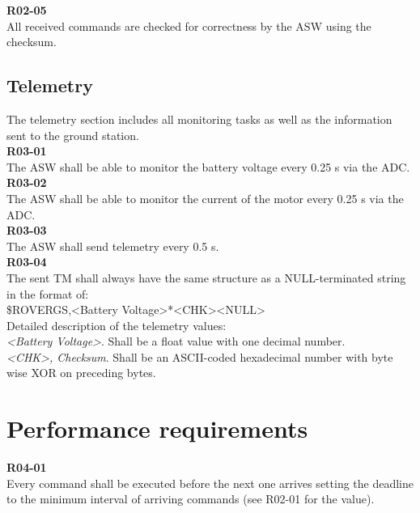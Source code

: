 \textbf{R02-05}\\
All received commands are checked for correctness by the ASW using the checksum.\\

\subsection{Telemetry}

The telemetry section includes all monitoring tasks as well as the information sent to the ground station.\\

\textbf{R03-01}\\
The ASW shall be able to monitor the battery voltage every 0.25 s via the ADC.\\

\textbf{R03-02}\\
The ASW shall be able to monitor the current of the motor every 0.25 s via the ADC.\\

\textbf{R03-03}\\
The ASW shall send telemetry every 0.5 s.\\

\textbf{R03-04}\\
The sent TM shall always have the same structure as a NULL-terminated string in the format of:\\

\$ROVERGS,<Battery Voltage>*<CHK><NULL>\\

Detailed description of the telemetry values:\\

\textit{<Battery Voltage>}. Shall be a float value with one decimal number.\\

\textit{<CHK>, Checksum}. Shall be an ASCII-coded hexadecimal number with byte wise XOR on preceding bytes.\\


\section{Performance requirements}

\textbf{R04-01}\\
Every command shall be executed before the next one arrives setting the deadline to the minimum interval of arriving commands (see R02-01 for the value).\\

